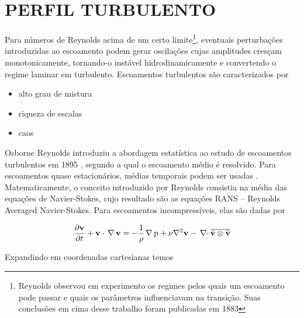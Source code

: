 
\section{PERFIL TURBULENTO}

Para números de Reynolds acima de um certo limite\footnote{Reynolds observou em experimento os regimes pelos quais um escoamento pode passar e quais os parâmetros influenciavam na transição. Suas conclusões em cima desse trabalho foram publicadas em 1883\cite{REYNOLDS83,DAVIDSON11}}, eventuais perturbações introduzidas ao escoamento podem gerar oscilações cujas amplitudes cresçam monotonicamente, tornando-o instável hidrodinamicamente e convertendo o regime laminar em turbulento. Escoamentos turbulentos são caracterizados por

\begin{itemize}
\item alto grau de mistura
\item riqueza de escalas
\item caos
\end{itemize}

Osborne Reynolds introduziu a abordagem estatística ao estudo de escoamentos turbulentos em 1895 \cite{REYNOLDS95}, segundo a qual o escoamento médio é resolvido. Para escoamentos quase estacionários, médias temporais podem ser usadas \cite{FREIRE02}. Matematicamente, o conceito introduzido por Reynolds consistia na média das equações de Navier-Stokes, cujo resultado são as equações RANS -- Reynolds Averaged Navier-Stokes. Para escoamentos incompressíveis, elas são dadas por

\begin{equation}
  \frac{\partial\mathbf{v}}{\partial t}+\mathbf{v}\cdot\,\rm \nabla\,\mathbf{v}=-\frac{1}{\rho}\,\rm \nabla\, p+\nu\nabla^2\mathbf{v}-{\,\nabla\cdot}\,\overline{\tilde{\mathbf{v}}\otimes\tilde{\mathbf{v}}}
  \label{eq:rans_incompressivel_1}
\end{equation}

Expandindo em coordenadas cartesianas temos

